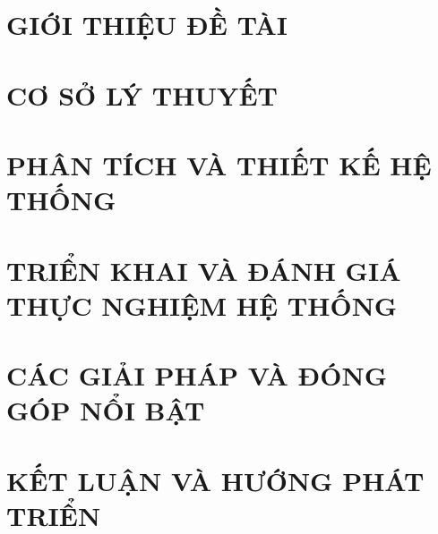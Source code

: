 \documentclass[a4paper,13pt,3p,twoside,openany]{report}
\renewcommand{\bibname}{Danh_sach_tai_lieu_tham_khao}
\theoremstyle{definition}
\begin{document}
\renewcommand{\listtablename}{DANH MỤC BẢNG BIỂU}
{\let\oldnumberline\numberline
\renewcommand{\numberline}{Bảng~\oldnumberline}
\listoftables}

\printnoidxglossary[type=\acronymtype,title={DANH MỤC THUẬT NGỮ VÀ TỪ VIẾT TẮT}]


% 


\newpage
{}

\pagestyle{fancy}
\fancyhf{}
\fancyhead[RE, LO]{\leftmark}
\fancyfoot[RE, LO]{\thepage}

\chapter{GIỚI THIỆU ĐỀ TÀI}
\label{chapter:Introduction}

\newpage
\chapter{CƠ SỞ LÝ THUYẾT}
\label{chapter:Theory}



\newpage
\chapter{PHÂN TÍCH VÀ THIẾT KẾ HỆ THỐNG}
\label{chapter:Analysis}


\newpage
\chapter{TRIỂN KHAI VÀ ĐÁNH GIÁ THỰC NGHIỆM HỆ THỐNG}
\label{chapter:Results}


\newpage
\chapter{CÁC GIẢI PHÁP VÀ ĐÓNG GÓP NỔI BẬT}
\label{chapter:SolutionAndContribution}

\newpage
\chapter{KẾT LUẬN VÀ HƯỚNG PHÁT TRIỂN} %
\label{chapter:conclusion}


\newpage
\renewcommand\bibname{TÀI LIỆU THAM KHẢO}
\nocite{*}
\printbibliography
{}
\end{document}
